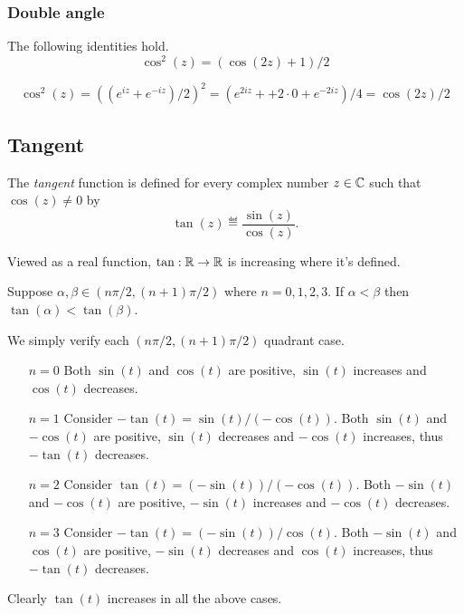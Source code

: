 \subsubsection{Double angle}

\begin{llem}
The following identities hold.
\begin{equation*}
\cos^2(z) = (\cos(2z) + 1)/2
\end{equation*}
\end{llem}
\begin{thmproof}
\begin{equation*}
\cos^2(z) 
= \left((e^{iz} + e^{-iz})/2\right)^2
= (e^{2iz} + + 2\cdot 0 + e^{-2iz})/4
= \cos(2z)/2
\end{equation*}
\end{thmproof}




\subsection{Tangent}

The \emph{tangent} function is defined for every complex number \(z\in\mathbb{C}\)
such that \(\cos(z) \neq 0\) by
\begin{equation} \label{eq:tan}
\tan(z) \eqdef \frac{\sin(z)}{\cos(z)}.
\end{equation}

Viewed as a real function, \(\tan: \mathbb{R}\to\mathbb{R}\) is increasing where it's defined.
\begin{llem} \label{llem:tan}
Suppose \(\alpha,\beta \in (n\pi/2, (n+1)\pi/2)\) where \(n=0,1,2,3\).
If \(\alpha < \beta\) then \(\tan(\alpha) < \tan(\beta)\).
\end{llem}
\begin{thmproof}
We simply verify each \((n\pi/2, (n+1)\pi/2)\) quadrant case. 
\begin{itemize}
\item[\(n=0\)] 
  Both \(\sin(t)\) and \(\cos(t)\) are positive, 
  \(\sin(t)\) increases and \(\cos(t)\) decreases. 
\item[\(n=1\)] Consider \(-\tan(t) = \sin(t)/(-\cos(t))\).
  Both \(\sin(t)\) and \(-\cos(t)\) are positive, 
  \(\sin(t)\) decreases and \(-\cos(t)\) increases, 
  thus \(-\tan(t)\) decreases.
\item[\(n=2\)] Consider \(\tan(t) = (-\sin(t))/(-\cos(t))\).
  Both \(-\sin(t)\) and \(-\cos(t)\) are positive, 
  \(-\sin(t)\) increases and \(-\cos(t)\) decreases.
\item[\(n=3\)] %
  Consider \(-\tan(t) = (-\sin(t))/\cos(t)\).
  Both \(-\sin(t)\) and \(\cos(t)\) are positive, 
  \(-\sin(t)\) decreases and \(\cos(t)\) increases,
  thus \(-\tan(t)\) decreases.
\end{itemize}
Clearly \(\tan(t)\) increases in all the above cases.
\end{thmproof}


